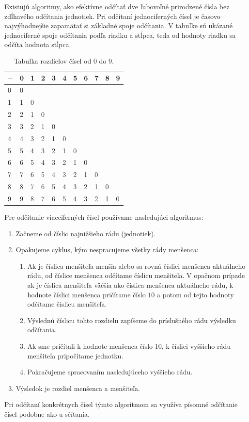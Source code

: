 \documentclass{report}
\begin{document}
Existujú algoritmy, ako efektívne odčítať dve ľubovoľné prirodzené čísla bez zdĺhavého odčítania jednotiek. Pri odčítaní jednociferných čísel je časovo najvýhodnejšie zapamätať si základné spoje odčítania. V tabuľke sú ukázané jednociferné spoje odčítania podľa riadku a stĺpca, teda od hodnoty riadku sa odčíta hodnota stĺpca.
\begin{table}[H]
  \centering
  \renewcommand{\arraystretch}{1.3}
  \begin{tabular}{C|CCCCCCCCCC}
    \(-\) & 0 & 1 & 2 & 3 & 4 & 5 & 6 & 7 & 8 & 9 \\
     & 0 &   &   &   &   &   &   &   &   &   \\
    1 & 1 & 0 &   &   &   &   &   &   &   &   \\
    2 & 2 & 1 & 0 &   &   &   &   &   &   &   \\
    3 & 3 & 2 & 1 & 0 &   &   &   &   &   &   \\
    4 & 4 & 3 & 2 & 1 & 0 &   &   &   &   &   \\
    5 & 5 & 4 & 3 & 2 & 1 & 0 &   &   &   &   \\
    6 & 6 & 5 & 4 & 3 & 2 & 1 & 0 &   &   &   \\
    7 & 7 & 6 & 5 & 4 & 3 & 2 & 1 & 0 &   &   \\
    8 & 8 & 7 & 6 & 5 & 4 & 3 & 2 & 1 & 0 &   \\
    9 & 9 & 8 & 7 & 6 & 5 & 4 & 3 & 2 & 1 & 0 \\
  \end{tabular}
  \caption{Tabuľka rozdielov čísel od \(0\) do \(9\).}
\end{table}

Pre odčítanie viacciferných čísel používame nasledujúci algoritmus:
\begin{enumerate}[label=\arabic*)]
  \item Začneme od číslic najnižšieho rádu (jednotiek).
  \item Opakujeme cyklus, kým nespracujeme všetky rády menšenca:
  \begin{enumerate}
    \item Ak je číslica menšiteľa menšia alebo sa rovná číslici menšenca aktuálneho rádu, od číslice menšenca odčítame číslicu menšiteľa. V opačnom prípade ak je číslica menšiteľa väčšia ako číslica menšenca aktuálneho rádu, k hodnote číslici menšenca pričítame číslo \(10\) a potom od tejto hodnoty odčítame číslicu menšiteľa.
    \item Výslednú číslicu tohto rozdielu zapíšeme do príslušného rádu výsledku odčítania.
    \item Ak sme pričítali k hodnote menšenca číslo \(10\), k číslici vyššieho rádu menšiteľa pripočítame jednotku.
    \item Pokračujeme spracovaním nasledujúceho vyššieho rádu.
  \end{enumerate}
  \item Výsledok je rozdiel menšenca a menšiteľa.
\end{enumerate}
Pri odčítaní konkrétnych čísel týmto algoritmom sa využíva písomné odčítanie čísel podobne ako u sčítania.
\end{document}
